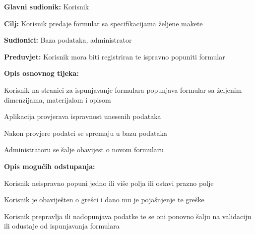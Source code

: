 				\noindent {}
				\begin{packed_item}
					
					\item \textbf{Glavni sudionik: }Korisnik
					\item  \textbf{Cilj:} Korisnik predaje formular sa specifikacijama željene makete 
					\item  \textbf{Sudionici:} Baza podataka, administrator
					\item  \textbf{Preduvjet:} Korisnik mora biti registriran te ispravno popuniti formular
					\item  \textbf{Opis osnovnog tijeka:}
					
					\item[] \begin{packed_enum}
						
						\item Korisnik na stranici za ispunjavanje formulara popunjava formular sa željenim dimenzijama, materijalom i opisom
						\item Aplikacija provjerava ispravnost unesenih podataka
						\item Nakon provjere podatci se spremaju u bazu podataka
						\item Administratoru se šalje obavijest o novom formularu
					\end{packed_enum}
					
					\item  \textbf{Opis mogućih odstupanja:}
					
					\item[] \begin{packed_item}
 
						\item[2.a] Korisnik neispravno popuni jedno ili više polja ili ostavi prazno polje
						\item[] \begin{packed_enum}
							
							\item Korisnik je obaviješten o grešci i dano mu je pojašnjenje te greške
							\item Korisnik prepravlja ili nadopunjava podatke te se oni ponovno šalju na validaciju ili odustaje od ispunjavanja formulara
							
						\end{packed_enum}	
					\end{packed_item}
				\end{packed_item}


